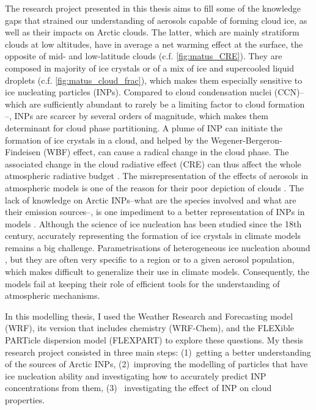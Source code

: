 The research project presented in this thesis aims to fill some of the knowledge gaps that strained our understanding of aerosols capable of forming cloud ice, as well as their impacts on Arctic clouds.
The latter, which are mainly stratiform clouds at low altitudes, have in average a net warming effect at the surface, the opposite of mid- and low-latitude clouds (c.f. \cref{fig:matus_CRE}).
They are composed in majority of ice crystals or of a mix of ice and supercooled liquid droplets (c.f. \cref{fig:matus_cloud_frac}), which makes them especially sensitive to ice nucleating particles (INPs). Compared to cloud condensation nuclei (CCN)\---which are sufficiently abundant to rarely be a limiting factor to cloud formation \citep{storelvmo_aerosol_2017}\---, INPs are scarcer by several orders of magnitude, which makes them determinant for cloud phase partitioning.
A plume of INP can initiate the formation of ice crystals in a cloud, and helped by the Wegener-Bergeron-Findeisen (WBF) effect, can cause a radical change in the cloud phase. The associated change in the cloud radiative effect (CRE) can thus affect the whole atmospheric radiative budget \citep{storelvmo_aerosol_2008}.
The misrepresentation of the effects of aerosols in atmospheric models is one of the reason for their poor depiction of clouds  \citep{bony_clouds_2015}. 
The lack of knowledge on Arctic INPs\---what are the species involved and what are their emission sources\---, is one impediment to a better representation of INPs in models \citep{murray_opinion_2021}.
Although the science of ice nucleation has been studied since the 18th century, accurately representing the formation of ice crystals in climate models remains a big challenge. Parametrisations of heterogeneous ice nucleation abound \citep[e.g.][]{fletcher_active_1969,cooper_ice_1986, demott_predicting_2010, li_predicting_2022}, but they are often very specific to a region or to a given aerosol population, which makes difficult to generalize their use in climate models.
Consequently, the models fail at keeping their role of efficient tools for the understanding of atmospheric mechanisms.

In this modelling thesis, I used the Weather Research and Forecasting model (WRF), its version that includes chemistry (WRF-Chem), and the FLEXible PARTicle dispersion model (FLEXPART) to explore these questions. %
My thesis research project consisted in three main steps: (1)~getting a better understanding of the sources of Arctic INPs, (2)~improving the modelling of particles that have ice nucleation ability and investigating how to accurately predict INP concentrations from them, (3)~ investigating the effect of INP on cloud properties.


